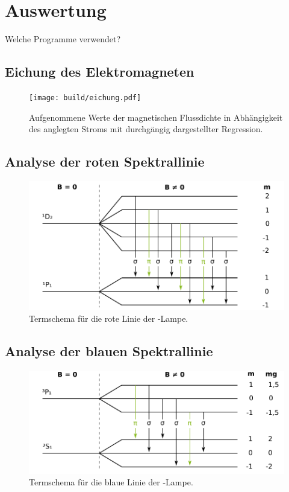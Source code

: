 \newpage
\section{Auswertung}
\label{sec:Auswertung}

Welche Programme verwendet?

\subsection{Eichung des Elektromagneten}
\label{sec:AuswEichung}



\begin{figure}
	\centering
	\texttt{[image: build/eichung.pdf]}
	\caption{Aufgenommene Werte der magnetischen Flussdichte in Abhängigkeit des
	anglegten Stroms mit durchgängig dargestellter Regression.}
	\label{fig:eichung}
\end{figure}


\subsection{Analyse der roten Spektrallinie}
\label{sec:AuswRot}

\begin{figure}
	\centering
	\includegraphics{images/termschema-rot.pdf}
	\caption{Termschema für die rote Linie der -Lampe.}
	\label{fig:termschema-rot}
\end{figure}


\subsection{Analyse der blauen Spektrallinie}
\label{sec:AuswBlau}

\begin{figure}
	\centering
	\includegraphics{images/termschema-blau.pdf}
	\caption{Termschema für die blaue Linie der -Lampe.}
	\label{fig:termschema-blau}
\end{figure}
